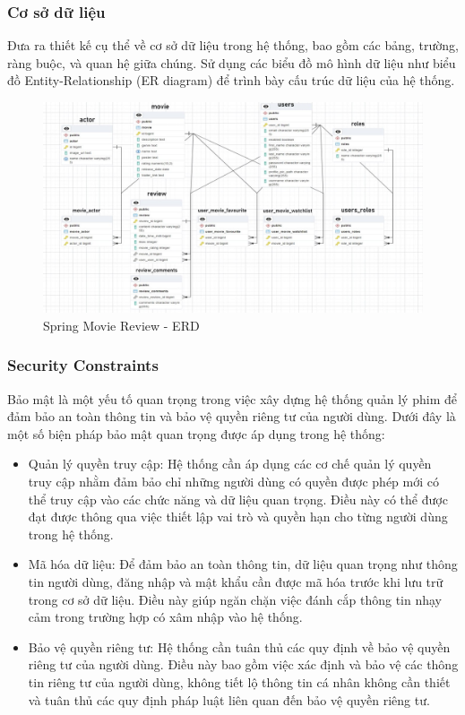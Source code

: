 \documentclass[12pt]{article}
\begin{document}
\subsubsection{Cơ sở dữ liệu}
Đưa ra thiết kế cụ thể về cơ sở dữ liệu trong hệ thống, bao gồm các bảng, trường, ràng buộc, và quan hệ giữa chúng. Sử dụng các biểu đồ mô hình dữ liệu như biểu đồ Entity-Relationship (ER diagram) để trình bày cấu trúc dữ liệu của hệ thống.
\begin{figure}[H]
    \centering
    \includegraphics[scale=1.5]{Figs/database.jpg}
    \caption{Spring Movie Review - ERD}
\end{figure}
\subsubsection{Security Constraints}
Bảo mật là một yếu tố quan trọng trong việc xây dựng hệ thống quản lý phim để đảm bảo an toàn thông tin và bảo vệ quyền riêng tư của người dùng. Dưới đây là một số biện pháp bảo mật quan trọng được áp dụng trong hệ thống:
\begin{itemize}
    \item Quản lý quyền truy cập: Hệ thống cần áp dụng các cơ chế quản lý quyền truy cập nhằm đảm bảo chỉ những người dùng có quyền được phép mới có thể truy cập vào các chức năng và dữ liệu quan trọng. Điều này có thể được đạt được thông qua việc thiết lập vai trò và quyền hạn cho từng người dùng trong hệ thống.

    \item Mã hóa dữ liệu: Để đảm bảo an toàn thông tin, dữ liệu quan trọng như thông tin người dùng, đăng nhập và mật khẩu cần được mã hóa trước khi lưu trữ trong cơ sở dữ liệu. Điều này giúp ngăn chặn việc đánh cắp thông tin nhạy cảm trong trường hợp có xâm nhập vào hệ thống.
    \item Bảo vệ quyền riêng tư: Hệ thống cần tuân thủ các quy định về bảo vệ quyền riêng tư của người dùng. Điều này bao gồm việc xác định và bảo vệ các thông tin riêng tư của người dùng, không tiết lộ thông tin cá nhân không cần thiết và tuân thủ các quy định pháp luật liên quan đến bảo vệ quyền riêng tư.
\end{itemize}
\end{document}
